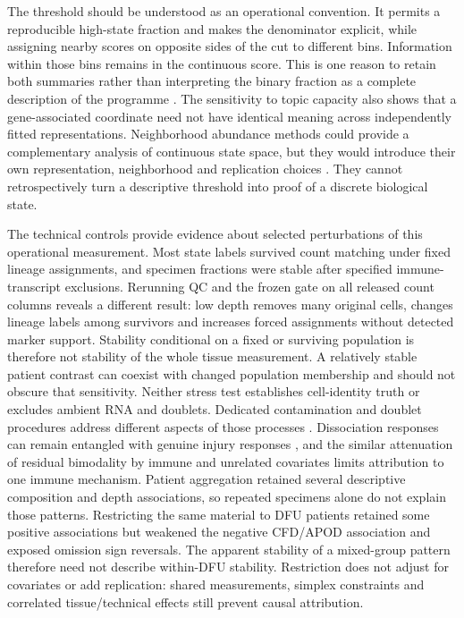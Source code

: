 \documentclass[10pt,a4paper]{article}
\begin{document}
The threshold should be understood as an operational convention. It permits a reproducible high-state fraction and makes the denominator explicit, while assigning nearby scores on opposite sides of the cut to different bins. Information within those bins remains in the continuous score. This is one reason to retain both summaries rather than interpreting the binary fraction as a complete description of the programme \citep{altman2006}. The sensitivity to topic capacity also shows that a gene-associated coordinate need not have identical meaning across independently fitted representations. Neighborhood abundance methods could provide a complementary analysis of continuous state space, but they would introduce their own representation, neighborhood and replication choices \citep{dann2022}. They cannot retrospectively turn a descriptive threshold into proof of a discrete biological state.

The technical controls provide evidence about selected perturbations of this operational measurement. Most state labels survived count matching under fixed lineage assignments, and specimen fractions were stable after specified immune-transcript exclusions. Rerunning QC and the frozen gate on all released count columns reveals a different result: low depth removes many original cells, changes lineage labels among survivors and increases forced assignments without detected marker support. Stability conditional on a fixed or surviving population is therefore not stability of the whole tissue measurement. A relatively stable patient contrast can coexist with changed population membership and should not obscure that sensitivity. Neither stress test establishes cell-identity truth or excludes ambient RNA and doublets. Dedicated contamination and doublet procedures address different aspects of those processes \citep{young2020,wolock2019}. Dissociation responses can remain entangled with genuine injury responses \citep{vandenbrink2017}, and the similar attenuation of residual bimodality by immune and unrelated covariates limits attribution to one immune mechanism. Patient aggregation retained several descriptive composition and depth associations, so repeated specimens alone do not explain those patterns. Restricting the same material to DFU patients retained some positive associations but weakened the negative CFD/APOD association and exposed omission sign reversals. The apparent stability of a mixed-group pattern therefore need not describe within-DFU stability. Restriction does not adjust for covariates or add replication: shared measurements, simplex constraints and correlated tissue/technical effects still prevent causal attribution.
\end{document}
